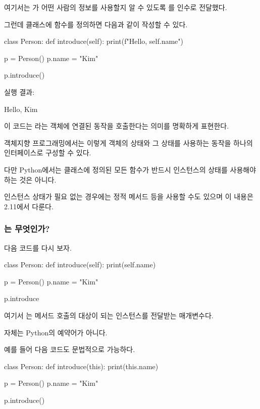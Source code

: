 여기서는 가 어떤 사람의 정보를 사용할지 알 수 있도록 를 인수로 전달했다.

그런데 클래스에 함수를 정의하면 다음과 같이 작성할 수 있다.

\begin{dhkcode}
class Person:
    def introduce(self):
        print(f"Hello, {self.name}")

p = Person()
p.name = "Kim"

p.introduce()
\end{dhkcode}

실행 결과:

\begin{dhkzsh}
Hello, Kim
\end{dhkzsh}

이 코드는 라는 객체에 연결된 동작을 호출한다는 의미를 명확하게 표현한다.

객체지향 프로그래밍에서는 이렇게 객체의 상태와 그 상태를 사용하는 동작을 하나의 인터페이스로 구성할 수 있다.

다만 Python에서는 클래스에 정의된 모든 함수가 반드시 인스턴스의 상태를 사용해야 하는 것은 아니다.

인스턴스 상태가 필요 없는 경우에는 정적 메서드 등을 사용할 수도 있으며 이 내용은 2.11에서 다룬다.

\subsubsection{는 무엇인가?}

다음 코드를 다시 보자.

\begin{dhkcode}
class Person:
    def introduce(self):
        print(self.name)

p = Person()
p.name = "Kim"

p.introduce
\end{dhkcode}

여기서 는 메서드 호출의 대상이 되는 인스턴스를 전달받는 매개변수다.

 자체는 Python의 예약어가 아니다.

예를 들어 다음 코드도 문법적으로 가능하다.

\begin{dhkcode}
class Person:
    def introduce(this):
        print(this.name)

p = Person()
p.name = "Kim"

p.introduce()
\end{dhkcode}

